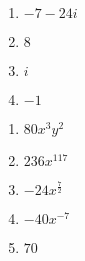\documentclass{ximera}
\begin{document}
\begin{multicols}{4}
\begin{enumerate}
\setcounter{enumi}{\value{HW}}

\item  $-7-24i$

\item  $8$

\item $i$

\item  $-1$

\setcounter{HW}{\value{enumi}}
\end{enumerate}
\end{multicols}


\begin{multicols}{5}

\begin{enumerate}
\setcounter{enumi}{\value{HW}}

\item  $80x^3y^2$

\item  $236x^{117}$

\item  $-24x^{\frac{7}{2}}$

\item  $-40 x^{-7}$

\item  $70$

\end{enumerate}

\end{multicols}
\end{document}
